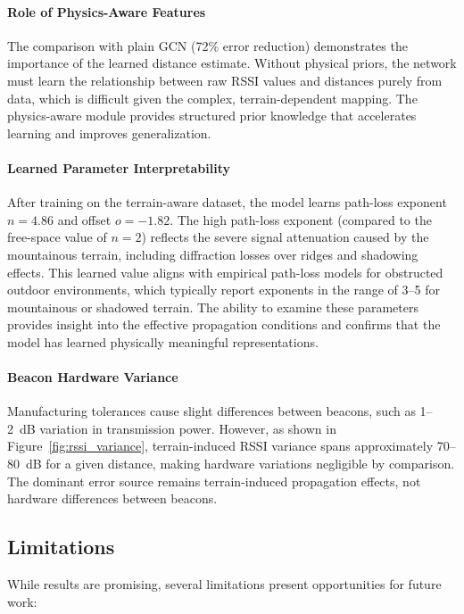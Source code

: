 \documentclass[master,final,11pt]{iscs-thesis}
\begin{document}
\paragraph{Role of Physics-Aware Features}
The comparison with plain GCN (72\% error reduction) demonstrates the importance of the learned distance estimate.
Without physical priors, the network must learn the relationship between raw RSSI values and distances purely from data, which is difficult given the complex, terrain-dependent mapping.
The physics-aware module provides structured prior knowledge that accelerates learning and improves generalization.

\paragraph{Learned Parameter Interpretability}
After training on the terrain-aware dataset, the model learns path-loss exponent $n = 4.86$ and offset $o = -1.82$.
The high path-loss exponent (compared to the free-space value of $n = 2$) reflects the severe signal attenuation caused by the mountainous terrain, including diffraction losses over ridges and shadowing effects.
This learned value aligns with empirical path-loss models for obstructed outdoor environments, which typically report exponents in the range of 3--5 for mountainous or shadowed terrain.
The ability to examine these parameters provides insight into the effective propagation conditions and confirms that the model has learned physically meaningful representations.

\paragraph{Beacon Hardware Variance}
Manufacturing tolerances cause slight differences between beacons, such as 1--2~dB variation in transmission power.
However, as shown in Figure~\ref{fig:rssi_variance}, terrain-induced RSSI variance spans approximately 70--80~dB for a given distance, making hardware variations negligible by comparison.
The dominant error source remains terrain-induced propagation effects, not hardware differences between beacons.

\subsection{Limitations}

While results are promising, several limitations present opportunities for future work:
\end{document}
